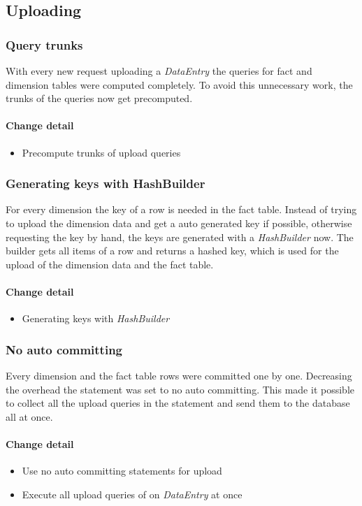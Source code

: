 \subsection{Uploading}
\subsubsection{Query trunks}
With every new request uploading a \textit{DataEntry} the queries 
for fact and dimension tables were computed completely. To avoid
this unnecessary work, the trunks of the queries now get precomputed.


\paragraph{Change detail}
\begin{itemize}
  \item Precompute trunks of upload queries
\end{itemize}


\subsubsection{Generating keys with HashBuilder}
For every dimension the key of a row is needed in the fact table.
Instead of trying to upload the dimension data and get a auto generated key if possible,
otherwise requesting the key by hand, the keys are generated with a
\textit{HashBuilder} now. The builder gets all items of a row and
returns a hashed key, which is used for the upload of the dimension data
and the fact table.

\paragraph{Change detail}
\begin{itemize}
  \item Generating keys with \textit{HashBuilder}
\end{itemize}


\subsubsection{No auto committing}
Every dimension and the fact table rows were committed one by one. Decreasing
the overhead the statement was set to no auto committing. This made it possible
to collect all the upload queries in the statement and send them to the database
all at once.

\paragraph{Change detail} 
\begin{itemize}
  \item Use no auto committing statements for upload
  \item Execute all upload queries of on \textit{DataEntry} at once
\end{itemize}


